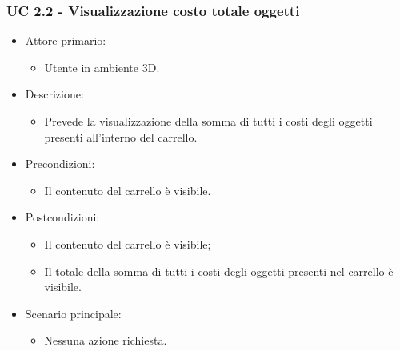 \subsubsection{UC 2.2 - Visualizzazione costo totale oggetti}
\begin{itemize}
	
	\item Attore primario: 
	\begin{itemize}
		\item Utente in ambiente 3D.
	\end{itemize}
	\item Descrizione:
	\begin{itemize}
		\item Prevede la visualizzazione della somma di tutti i costi degli oggetti presenti all'interno del carrello.
	\end{itemize}
	
	\item Precondizioni:
	\begin{itemize}
		\item Il contenuto del carrello è visibile.
	\end{itemize}
	
	\item Postcondizioni:
	\begin{itemize}
		\item Il contenuto del carrello è visibile;
		\item Il totale della somma di tutti i costi degli oggetti presenti nel carrello è visibile.
	\end{itemize}
	
	\item Scenario principale:
	\begin{itemize}
		\item Nessuna azione richiesta.
	\end{itemize}
	
\end{itemize}

\pagebreak

